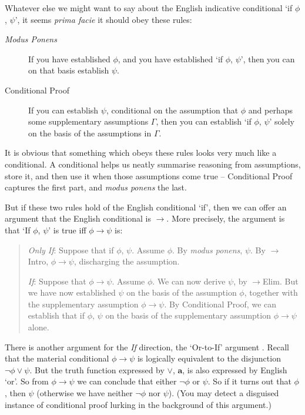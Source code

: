 Whatever else we might want to say about the English indicative conditional `if $\phi$, $\psi$', it seems \emph{prima facie} it should obey these rules: \begin{description}
	\item [\emph{Modus Ponens}]  If you have established $\phi$, and you have established  `if $\phi$, $\psi$', then you can on that basis establish $\psi$.
	\item [Conditional Proof] If you can establish $\psi$, conditional on the assumption that $\phi$ and perhaps some supplementary assumptions $\Gamma$, then you can establish `if $\phi$, $\psi$' solely on the basis of the assumptions in $\Gamma$. 
\end{description}
It is obvious that something which obeys these rules looks very much like a conditional. A conditional helps us neatly summarise reasoning from assumptions, store it, and then use it when those assumptions come true – Conditional Proof captures the first part, and \emph{modus ponens} the last. 

But if these two rules hold of the English conditional `if', then we can offer an argument that the English conditional is $\to$. More precisely, the argument is that ‘If $\phi$, $\psi$’ is true iff $\phi \to \psi$ is:  \begin{quote}
	\emph{Only If}: Suppose that if $\phi$, $\psi$. Assume $\phi$. By \emph{modus ponens}, $\psi$. By $\to$Intro, $\phi\to\psi$, discharging the assumption.

\emph{If}: Suppose that $\phi \to \psi$. Assume $\phi$. We can now derive $\psi$, by $\to$Elim. But we have now established $\psi$ on the basis of the assumption $\phi$, together with the supplementary assumption $\phi\to \psi$. By Conditional Proof, we can establish that if $\phi$, $\psi$ on the basis of the supplementary assumption $\phi\to \psi$ alone. 
\end{quote}


There is another argument for the \emph{If} direction, the `Or-to-If' argument \citep{stalnaker}. Recall that the material conditional $\phi\to \psi$ is logically equivalent to the disjunction $¬ \phi\vee \psi$. But the truth function expressed by $\vee$, $\mathbf{a}$, is also expressed by English `or'. So from $\phi\to \psi$ we can conclude that either $¬ \phi$ or $\psi$. So if it turns out that $\phi$, then $\psi$ (otherwise we have neither $¬ \phi$ nor $\psi$). (You may detect a disguised instance of conditional proof lurking in the background of this argument.)


